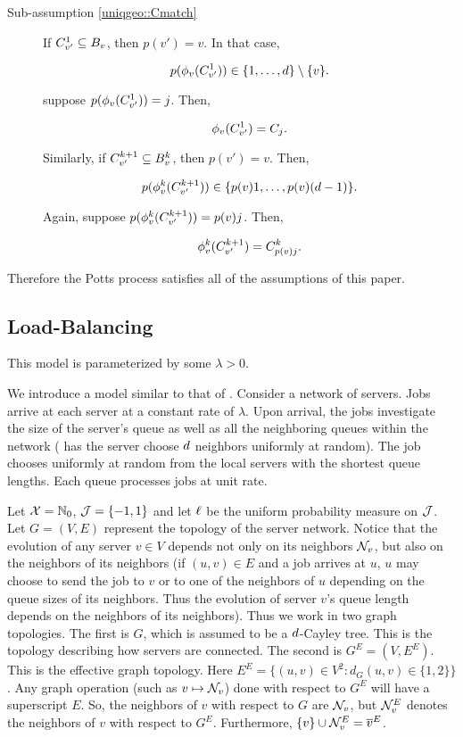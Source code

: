 \begin{description}
\begin{description}
\item[Sub-assumption \ref{uniqgeo::Cmatch}] If \(C^{1}_{v'} \subseteq B_v\), then \(p(v') = v\). In that case,

\[p(\phi_v(C^{1}_{v'})) \in \{1,\dots,d\}\setminus\{v\}.\]

suppose \(p(\phi_v(C^{1}_{v'})) = j\). Then,

\[\phi_v(C^{1}_{v'}) = C_j.\]

Similarly, if \(C^{k+1}_{v'} \subseteq B^{k}_v\), then \(p(v') = v\). Then,

\[p(\phi^{k}_v(C^{k+1}_{v'})) \in \{p(v)1,\dots,p(v)(d-1)\}.\]

Again, suppose \(p(\phi^{k}_v(C^{k+1}_{v'})) = p(v)j\). Then,

\[\phi^{k}_v(C^{k+1}_{v'}) = C^{k}_{p(v)j}.\]
\end{description}
\end{description}

Therefore the Potts process satisfies all of the assumptions of this paper.

\subsection{Load-Balancing}
\label{ex::lb}
 This model is parameterized by some \(\lambda > 0\).

\ind We introduce a model similar to that of \cite{BudMukWu17}. Consider a network of servers. Jobs arrive at each server at a constant rate of \(\lambda\). Upon arrival, the jobs investigate the size of the server's queue as well as all the neighboring queues within the network (\cite{BudMukWu17} has the server choose \(d\) neighbors uniformly at random). The job chooses uniformly at random from the local servers with the shortest queue lengths. Each queue processes jobs at unit rate.

\ind Let \(\mathcal{X} = \mathbb{N}_0\), \(\mathcal{J} = \{-1,1\}\) and let \(\ell\) be the uniform probability measure on \(\mathcal{J}\). Let \(G = (V,E)\) represent the topology of the server network. Notice that the evolution of any server \(v \in V\) depends not only on its neighbors \(\mathcal{N}_{v}\), but also on the neighbors of its neighbors (if \((u,v) \in E\) and a job arrives at \(u\), \(u\) may choose to send the job to \(v\) or to one of the neighbors of \(u\) depending on the queue sizes of its neighbors. Thus the evolution of server \(v\)'s queue length depends on the neighbors of its neighbors). Thus we work in two graph topologies. The first is \(G\), which is assumed to be a \(d\)-Cayley tree. This is the topology describing how servers are connected. The second is \(G^E = (V,E^E)\). This is the effective graph topology. Here \(E^E = \{(u,v) \in V^2: d_G(u,v) \in \{1,2\}\}\). Any graph operation (such as \(v\mapsto \mathcal{N}_{v}\)) done with respect to \(G^E\) will have a superscript \(E\). So, the neighbors of \(v\) with respect to \(G\) are \(\mathcal{N}_{v}\), but \(\mathcal{N}^E_{v}\) denotes the neighbors of \(v\) with respect to \(G^E\). Furthermore, \(\{v\}\cup\mathcal{N}^E_{v} = \overline{v}^E\).

